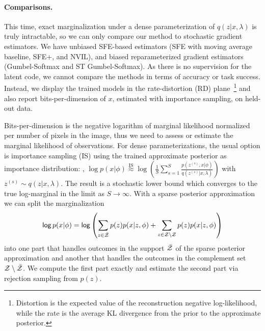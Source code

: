 \begin{sloppypar}
    \paragraph*{Comparisons.} This time, exact marginalization under a
    dense parameterization of $q (z | x, \lambda)$ is truly intractable,
    so we can only compare our method to stochastic gradient estimators.
    We have unbiased SFE-based estimators (SFE with moving average
    baseline, SFE+, and NVIL), and biased reparameterized gradient
    estimators (Gumbel-Softmax and ST Gumbel-Softmax). As there is no
    supervision for the latent code, we cannot compare the methods in
    terms of accuracy or task success. Instead, we display the trained
    models in the rate-distortion (RD)
    plane~\citep{Alemi2018}\footnote{Distortion is the expected value of
        the reconstruction negative log-likelihood, while the rate is the average
        KL divergence from the prior to the approximate posterior.} and also
    report bits-per-dimension of $x$, estimated with importance sampling,
    on held-out data.
\end{sloppypar}

Bits-per-dimension is the negative logarithm of marginal likelihood
normalized per number of pixels in the image, thus we need to assess
or estimate the marginal likelihood of observations. For dense
parameterizations, the usual option is importance sampling (IS) using
the trained approximate posterior as importance distribution: \ie,
$\log p(x|\phi) \overset{\text{IS}}{\approx} \log \left(\frac{1}{S}
    \sum_{s=1}^S \frac{p(z^{(s)}, x|\phi)}{q(z^{(s)} | x, \lambda)}
    \right)$ with $z^{(s)} \sim q(z|x, \lambda)$. The result is a
stochastic lower bound which converges to the true log-marginal in
the limit as $S \to \infty$. With a sparse posterior approximation we
can split the marginalization
%
\begin{equation}
    \operatorname*{\mathsf{log}} p(x|\phi) = \operatorname*{\mathsf{log}} \left( \sum_{z \in \bar {\mathcal{Z}}}
    p(z)p(x|z, \phi) + \sum_{z \in \mathcal{Z} \setminus \mathcal{Z}} p(z)p(x|z, \phi)
    \right)
\end{equation}
%
into one part that handles outcomes in the support $\bar {\mathcal{Z}}$ of the
sparse posterior approximation and another that handles the
outcomes in the complement set $\mathcal{Z} \setminus \bar {\mathcal{Z}}$. We compute
the first part exactly and estimate the second part via rejection
sampling from $p(z)$.


